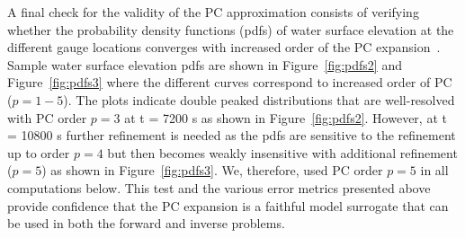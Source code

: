 A final check for the validity of the PC approximation 
consists of verifying whether the probability density
functions (pdfs) of water surface elevation at the different gauge locations
converges with increased order of the PC expansion~\cite{Alexanderian2012,sraj:2013a}.  Sample
water surface elevation pdfs are shown in Figure~\ref{fig:pdfs2}
and Figure~\ref{fig:pdfs3} where
the different curves correspond to increased order of PC ($p= 1-5$).
The plots indicate double peaked distributions that are
well-resolved with PC order $p=3$ at t = 7200 s as shown in Figure~\ref{fig:pdfs2}.
However, at t = 10800 s further refinement is needed as the pdfs are
sensitive to the refinement up to order $p=4$ but then becomes weakly 
insensitive with additional refinement  ($p = 5$) as shown in Figure~\ref{fig:pdfs3}. 
We, therefore, used PC order $p = 5$ in all computations below.
This test and the various error metrics presented above provide confidence that the PC expansion is a faithful 
model surrogate that can be used in both the forward and inverse problems. 

